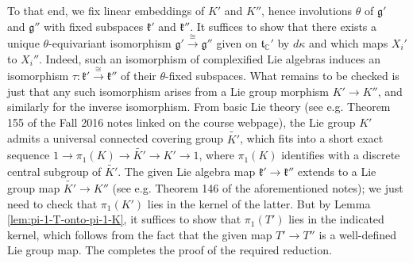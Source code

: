 \documentclass[reqno]{amsart} 
\begin{document}
To that end, we fix linear embeddings of $K'$ and $K''$, hence involutions $\theta$ of $\mathfrak{g} '$ and $\mathfrak{g} ''$ with fixed subspaces $\mathfrak{k} '$ and $\mathfrak{k} ''$.  It suffices to show that there exists a unique $\theta$-equivariant isomorphism $\mathfrak{g} ' \xrightarrow{\cong } \mathfrak{g} ''$ given on $\mathfrak{t}_{\mathbb{C}} '$ by $d \kappa$ and which maps $X_i'$ to $X_i''$.  Indeed, such an isomorphism of complexified Lie algebras induces an isomorphism $\tau : \mathfrak{k} ' \xrightarrow{\cong } \mathfrak{k} ''$ of their $\theta$-fixed subspaces.  What remains to be checked is just that any such isomorphism arises from a Lie group morphism $K' \rightarrow K''$, and similarly for the inverse isomorphism.  From basic Lie theory (see e.g. Theorem 155 of the Fall 2016 notes linked on the course webpage), the Lie group $K'$ admits a universal connected covering group $\widetilde{K'}$, which fits into a short exact sequence $1 \rightarrow \pi_1(K) \rightarrow \widetilde{K'} \rightarrow K' \rightarrow 1$, where $\pi_1(K)$ identifies with a discrete central subgroup of $\widetilde{K'}$.  The given Lie algebra map $\mathfrak{k} ' \rightarrow \mathfrak{k} ''$ extends to a Lie group map $\widetilde{K'} \rightarrow K''$ (see e.g. Theorem 146 of the aforementioned notes); we just need to check that $\pi_1(K')$ lies in the kernel of the latter.  But by Lemma \ref{lem:pi-1-T-onto-pi-1-K}, it suffices to show that $\pi_1(T')$ lies in the indicated kernel, which follows from the fact that the given map $T' \rightarrow T''$ is a well-defined Lie group map.  The completes the proof of the required reduction.
\end{document}
